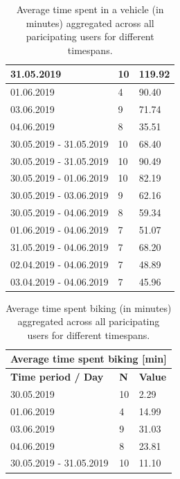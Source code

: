 \begin{table}[]
{\begin{tabular}{|l|l|l|}
			31.05.2019                 & 10         & 119.92                   \\ \hline
			01.06.2019                 & 4          & 90.40                    \\ \hline
			03.06.2019                 & 9          & 71.74                    \\ \hline
			04.06.2019                 & 8          & 35.51                    \\ \hline
			30.05.2019 - 31.05.2019    & 10         & 68.40                    \\ \hline
			30.05.2019 - 31.05.2019    & 10         & 90.49                    \\ \hline
			30.05.2019 - 01.06.2019    & 10         & 82.19                    \\ \hline
			30.05.2019 - 03.06.2019    & 9          & 62.16                    \\ \hline
			30.05.2019 - 04.06.2019    & 8          & 59.34                    \\ \hline
			01.06.2019 - 04.06.2019    & 7          & 51.07                    \\ \hline
			31.05.2019 - 04.06.2019    & 7          & 68.20                    \\ \hline
			02.04.2019 - 04.06.2019    & 7          & 48.89                    \\ \hline
			03.04.2019 - 04.06.2019    & 7          & 45.96                    \\ \hline
		\end{tabular}
		\caption{Average time spent in a vehicle (in minutes) aggregated across all paricipating users for different timespans.}

		\label{results-vehicle}
	}
\end{table}

\begin{table}[]
	\centering
	\begin{tabular}{|l|l|l|}
		\hline
		\multicolumn{3}{|c|}{\textbf{Average time spent biking {[}min{]}}}           \\ \hline
		\textbf{Time period / Day} & \textbf{N} & \textbf{Value} \\ \hline
		30.05.2019                 & 10         & 2.29                     \\ \hline
		01.06.2019                 & 4          & 14.99                    \\ \hline
		03.06.2019                 & 9          & 31.03                    \\ \hline
		04.06.2019                 & 8          & 23.81                    \\ \hline
		30.05.2019 - 31.05.2019    & 10         & 11.10                    \\ \hline
	\end{tabular}
		\caption{Average time spent biking (in minutes) aggregated across all paricipating users for different timespans.}
	\label{results-biking}
\end{table}

